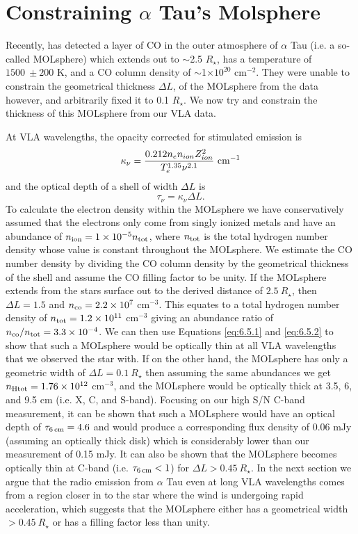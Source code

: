 \section{Constraining $\alpha$ Tau's Molsphere}\label{sec:6.5a}
Recently, \cite{ohnaka_2013} has detected a layer of CO in the outer atmosphere of $\alpha$ Tau (i.e. a so-called MOLsphere) which extends out to $\sim$2.5 $R_{\star}$, has a temperature of $1500 \ \pm 200$ K, and a CO column density of $\sim$1$\times 10^{20}$ cm$^{-2}$. They were unable to constrain the geometrical thickness $\Delta L$, of the MOLsphere from the data however, and arbitrarily fixed it to 0.1 $R_{\star}$. We now try and constrain the thickness of this MOLsphere from our VLA data.

At VLA wavelengths, the opacity corrected for stimulated emission is
\begin{equation}
\kappa _{\nu} =\frac{0.212n_{e}n_{ion}Z_{ion}^2}{T_{e}^{1.35}\nu ^{2.1}} \ \rm{cm}^{-1}
\label{eq:6.5.1}
\end{equation}
and the optical depth of a shell of width $\Delta L$ is
\begin{equation}
\tau _{\nu} =\kappa _{\nu}\Delta L.
\label{eq:6.5.2}
\end{equation}
To calculate the electron density within the MOLsphere we have conservatively assumed that the electrons only come from singly ionized metals and have an abundance of $n_{\rm{ion}}=1\times 10^{-5} n_{\rm{tot}}$, where $n_{\rm{tot}}$ is the total hydrogen number density whose value is constant throughout the MOLsphere. We estimate the CO number density by dividing the CO column density by the geometrical thickness of the shell and assume the CO filling factor to be unity. If the MOLsphere extends from the stars surface out to the derived distance of $2.5 \ R_{\star}$, then $\Delta L = 1.5$ and $n_{\rm{co}} = 2.2 \times 10^{7} $ cm$^{-3}$. This equates to a total hydrogen number density of $n_{\rm{tot}}=1.2 \times 10^{11}$ cm$^{-3}$ \citep{ohnaka_2013} giving an abundance ratio of $n_{\rm{co}}/n_{\rm{tot}} = 3.3\times 10^{-4}$. We can then use Equations \ref{eq:6.5.1} and \ref{eq:6.5.2} to show that such a MOLsphere would be optically thin at all VLA wavelengths that we observed the star with. If on the other hand, the MOLsphere has only a geometric width of $\Delta L = 0.1 \ R_{\star}$ then assuming the same abundances we get $n_{\rm{Htot}}=1.76\times 10^{12}$ cm$^{-3}$, and the MOLsphere would be optically thick at 3.5, 6, and 9.5 cm (i.e. X, C, and S-band). Focusing on our high S/N C-band measurement, it can be shown that such a MOLsphere would have an optical depth of $\tau _{\rm{6\,cm}} = 4.6$ and would produce a corresponding flux density of  0.06 mJy (assuming an optically thick disk) which is considerably lower than our measurement of 0.15 mJy. It can also be shown that the MOLsphere becomes optically thin at C-band (i.e. $\tau _{\rm{6\,cm}} < 1$) for $\Delta L > 0.45 \ R_{\star}$. In the next section we argue that the radio emission from $\alpha$ Tau even at long VLA wavelengths comes from a region closer in to the star where the wind is undergoing rapid acceleration, which suggests that the MOLsphere either has a geometrical width  $> 0.45 \ R _{\star}$ or has a filling factor less than unity.

